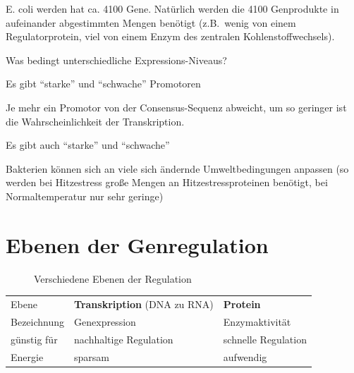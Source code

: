 


E. coli werden hat ca.
4100 Gene.
Natürlich werden
die 4100 Genprodukte in aufeinander abgestimmten
Mengen benötigt (z.B.\ wenig von einem
Regulatorprotein, viel von einem Enzym des
zentralen Kohlenstoffwechsels).

\begin{center}
    Was bedingt unterschiedliche Expressions-Niveaus?
\end{center}

Es gibt ``starke'' und
``schwache'' Promotoren

Je mehr ein Promotor von der
Consensus-Sequenz abweicht, um so
geringer ist die Wahrscheinlichkeit der
Transkription.


Es gibt auch ``starke'' und
``schwache'' 


Bakterien können sich an viele sich ändernde
Umweltbedingungen anpassen (so werden bei
Hitzestress große Mengen an Hitzestressproteinen
benötigt, bei Normaltemperatur nur sehr geringe)

\section{Ebenen der Genregulation}\label{sec:ebenen-der-genregulation}
\begin{figure}
    \caption{Verschiedene Ebenen der Regulation}\label{fig:figure15}
\end{figure}

\begin{table}[H]
    \centering
    \begin{tabular}{p{2cm} p{5cm} p{5cm}}
        Ebene & \textbf{Transkription} (DNA zu RNA) & \textbf{Protein} \\
        Bezeichnung & Genexpression & Enzymaktivität \\
        günstig für & nachhaltige
        Regulation & schnelle Regulation \\
        Energie & sparsam & aufwendig \\
    \end{tabular}\label{tab:table3}
\end{table}

